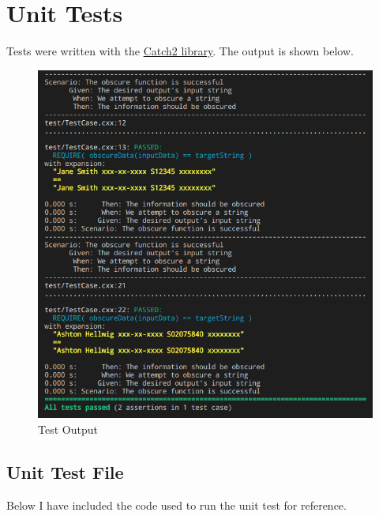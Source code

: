 \documentclass[a4paper, 11pt]{article}
\theoremstyle{definition}
\theoremstyle{plain}
\begin{document}
  \newpage
  \section{Unit Tests}
    Tests were written with the
      \href{https://github.com/catchorg/catch}{Catch2 library}. The output is
      shown below.

    \begin{figure}[H]
      \caption{Test Output}
      \centering
      \includegraphics[width=\textwidth]{testout.png}
    \end{figure}

    \newpage
    \subsection{Unit Test File}
      Below I have included the code used to run the unit test for reference.
\end{document}

